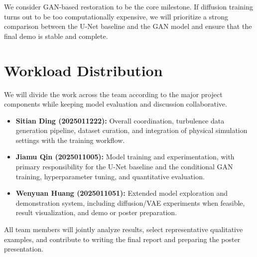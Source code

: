 \documentclass{article}
\begin{document}
We consider GAN-based restoration to be the core milestone. If diffusion training turns out to be too computationally expensive, we will prioritize a strong comparison between the U-Net baseline and the GAN model and ensure that the final demo is stable and complete.

\section{Workload Distribution}
We will divide the work across the team according to the major project components while keeping model evaluation and discussion collaborative.

\begin{itemize}
  \item \textbf{Sitian Ding (2025011222):} Overall coordination, turbulence data generation pipeline, dataset curation, and integration of physical simulation settings with the training workflow.
  \item \textbf{Jiamu Qin (2025011005):} Model training and experimentation, with primary responsibility for the U-Net baseline and the conditional GAN training, hyperparameter tuning, and quantitative evaluation.
  \item \textbf{Wenyuan Huang (2025011051):} Extended model exploration and demonstration system, including diffusion/VAE experiments when feasible, result visualization, and demo or poster preparation.
\end{itemize}

All team members will jointly analyze results, select representative qualitative examples, and contribute to writing the final report and preparing the poster presentation.



\end{document}
